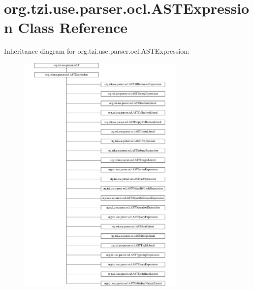 \hypertarget{classorg_1_1tzi_1_1use_1_1parser_1_1ocl_1_1_a_s_t_expression}{\section{org.\-tzi.\-use.\-parser.\-ocl.\-A\-S\-T\-Expression Class Reference}
\label{classorg_1_1tzi_1_1use_1_1parser_1_1ocl_1_1_a_s_t_expression}
}
Inheritance diagram for org.\-tzi.\-use.\-parser.\-ocl.\-A\-S\-T\-Expression\-:\begin{figure}[H]
\begin{center}
\leavevmode
\includegraphics[height=12.000000cm]{classorg_1_1tzi_1_1use_1_1parser_1_1ocl_1_1_a_s_t_expression}
\end{center}
\end{figure}
